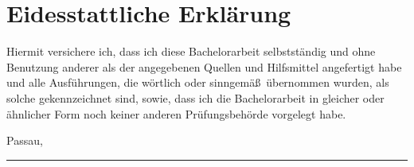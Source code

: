 \chapter{Eidesstattliche Erkl\"arung}


	Hiermit versichere ich, dass ich diese Bachelorarbeit selbstständig und ohne Benutzung anderer als der angegebenen Quellen und Hilfsmittel angefertigt habe und alle Ausführungen, die wörtlich oder sinngemä\ss ~übernommen wurden, als solche gekennzeichnet sind, sowie, dass ich die Bachelorarbeit in gleicher oder ähnlicher Form noch keiner anderen Prüfungsbehörde vorgelegt habe.


	\vspace{3cm}


	Passau, \thedate


	\vspace{2cm}


	\parbox{8cm}{
		\hrule \strut \theauthor
	}

